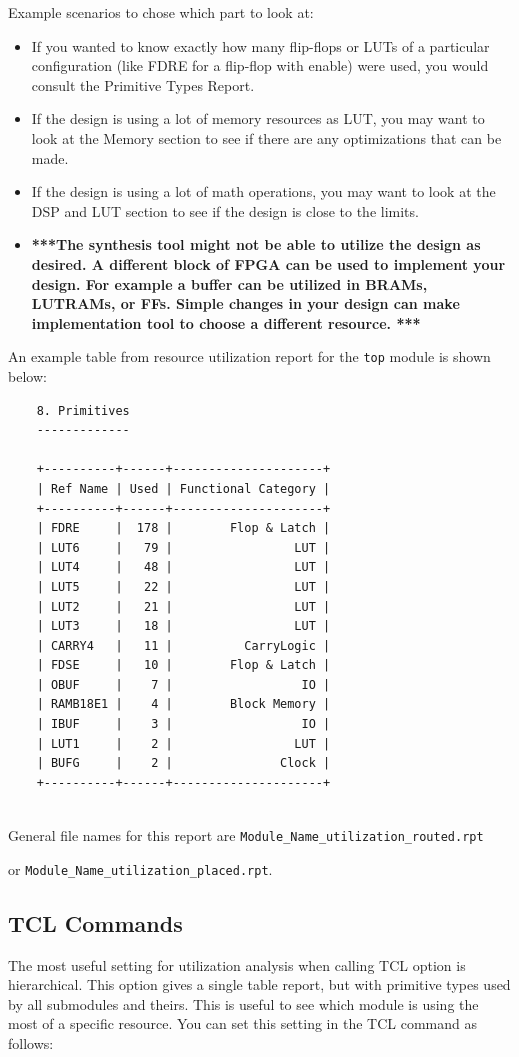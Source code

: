 \documentclass{report}
\begin{document}
Example scenarios to chose which part to look at:
\begin{itemize}
    \item If you wanted to know exactly how many flip-flops or LUTs of a particular configuration (like FDRE for a flip-flop with enable) were used, you would consult the Primitive Types Report.
    \item If the design is using a lot of memory resources as LUT, you may want to look at the Memory section to see if there are any optimizations that can be made.
    \item If the design is using a lot of math operations, you may want to look at the DSP and LUT section to see if the design is close to the limits.
    \item \textbf{***The synthesis tool might not be able to utilize the design as desired. A different block of FPGA can be used to implement your design. For example a buffer can be utilized in BRAMs, LUTRAMs, or FFs. Simple changes in your design can make implementation tool to choose a different resource. ***} 
\end{itemize}
An example table from resource utilization report for the \texttt{top} module is shown below:


\begin{verbatim}
    8. Primitives
    -------------
    
    +----------+------+---------------------+
    | Ref Name | Used | Functional Category |
    +----------+------+---------------------+
    | FDRE     |  178 |        Flop & Latch |
    | LUT6     |   79 |                 LUT |
    | LUT4     |   48 |                 LUT |
    | LUT5     |   22 |                 LUT |
    | LUT2     |   21 |                 LUT |
    | LUT3     |   18 |                 LUT |
    | CARRY4   |   11 |          CarryLogic |
    | FDSE     |   10 |        Flop & Latch |
    | OBUF     |    7 |                  IO |
    | RAMB18E1 |    4 |        Block Memory |
    | IBUF     |    3 |                  IO |
    | LUT1     |    2 |                 LUT |
    | BUFG     |    2 |               Clock |
    +----------+------+---------------------+
    
\end{verbatim}

General file names for this report are \texttt{Module\_Name\_utilization\_routed.rpt} 

or \texttt{Module\_Name\_utilization\_placed.rpt}.

\subsection{TCL Commands}
The most useful setting for utilization analysis when calling TCL option is hierarchical. This option gives a single table report, but with primitive types used by all submodules and theirs. This is useful to see which module is using the most of a specific resource. You can set this setting in the TCL command as follows:
\end{document}
